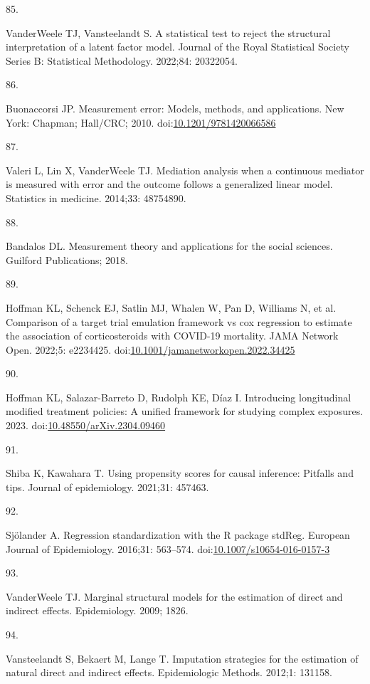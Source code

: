 \documentclass[
  singlecolumn]{article}
\newlength{\cslhangindent}
\newlength{\csllabelwidth}
\newlength{\cslentryspacingunit} %
\newenvironment{CSLReferences}[2] %
 {%
  \setlength{\parindent}{0pt}
  \ifodd #1
  \let\oldpar\par
  \def\par{\hangindent=\cslhangindent\oldpar}
  \fi
  \setlength{\parskip}{#2\cslentryspacingunit}
 }%
 {}
\newcommand{\CSLLeftMargin}[1]{\parbox[t]{\csllabelwidth}{#1}}
\newcommand{\CSLRightInline}[1]{\parbox[t]{\linewidth - \csllabelwidth}{#1}\break}
\begin{document}
\begin{CSLReferences}{0}{0}
\leavevmode{}%
\CSLLeftMargin{85. }%
\CSLRightInline{VanderWeele TJ, Vansteelandt S. A statistical test to
reject the structural interpretation of a latent factor model. Journal
of the Royal Statistical Society Series B: Statistical Methodology.
2022;84: 20322054. }

\leavevmode{}%
\CSLLeftMargin{86. }%
\CSLRightInline{Buonaccorsi JP. Measurement error: Models, methods, and
applications. New York: Chapman; Hall/CRC; 2010.
doi:\href{https://doi.org/10.1201/9781420066586}{10.1201/9781420066586}}

\leavevmode{}%
\CSLLeftMargin{87. }%
\CSLRightInline{Valeri L, Lin X, VanderWeele TJ. Mediation analysis when
a continuous mediator is measured with error and the outcome follows a
generalized linear model. Statistics in medicine. 2014;33: 48754890. }

\leavevmode{}%
\CSLLeftMargin{88. }%
\CSLRightInline{Bandalos DL. Measurement theory and applications for the
social sciences. Guilford Publications; 2018. }

\leavevmode{}%
\CSLLeftMargin{89. }%
\CSLRightInline{Hoffman KL, Schenck EJ, Satlin MJ, Whalen W, Pan D,
Williams N, et al. Comparison of a target trial emulation framework vs
cox regression to estimate the association of corticosteroids with
COVID-19 mortality. JAMA Network Open. 2022;5: e2234425.
doi:\href{https://doi.org/10.1001/jamanetworkopen.2022.34425}{10.1001/jamanetworkopen.2022.34425}}

\leavevmode{}%
\CSLLeftMargin{90. }%
\CSLRightInline{Hoffman KL, Salazar-Barreto D, Rudolph KE, Díaz I.
Introducing longitudinal modified treatment policies: A unified
framework for studying complex exposures. 2023.
doi:\href{https://doi.org/10.48550/arXiv.2304.09460}{10.48550/arXiv.2304.09460}}

\leavevmode{}%
\CSLLeftMargin{91. }%
\CSLRightInline{Shiba K, Kawahara T. Using propensity scores for causal
inference: Pitfalls and tips. Journal of epidemiology. 2021;31: 457463.
}

\leavevmode{}%
\CSLLeftMargin{92. }%
\CSLRightInline{Sjölander A. Regression standardization with the R
package stdReg. European Journal of Epidemiology. 2016;31: 563--574.
doi:\href{https://doi.org/10.1007/s10654-016-0157-3}{10.1007/s10654-016-0157-3}}

\leavevmode{}%
\CSLLeftMargin{93. }%
\CSLRightInline{VanderWeele TJ. Marginal structural models for the
estimation of direct and indirect effects. Epidemiology. 2009; 1826. }

\leavevmode{}%
\CSLLeftMargin{94. }%
\CSLRightInline{Vansteelandt S, Bekaert M, Lange T. Imputation
strategies for the estimation of natural direct and indirect effects.
Epidemiologic Methods. 2012;1: 131158. }

\end{CSLReferences}
\end{document}
